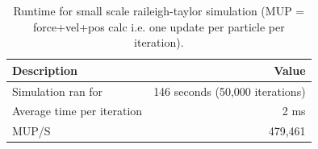 \documentclass{article}
\begin{document}
\begin{table}[h!]
    \centering
    \begin{tabular}{|l|r|}
        \hline
        \textbf{Description} & \textbf{Value} \\ \hline
        Simulation ran for & 146 seconds (50,000 iterations) \\ \hline
        Average time per iteration & 2 ms \\ \hline
        MUP/S & 479,461 \\ \hline
    \end{tabular}
    \caption{Runtime for small scale raileigh-taylor simulation (MUP = force+vel+pos calc i.e. one update per particle per iteration).}
    \label{table:small_raileigh}
\end{table}
\end{document}
